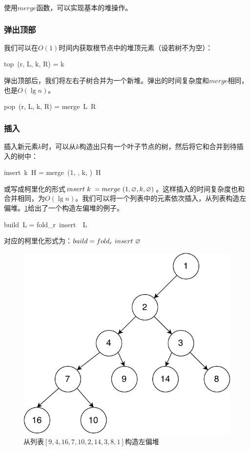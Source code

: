 \documentclass[b5paper]{ctexart}
\begin{document}
使用$merge$函数，可以实现基本的堆操作。

\subsubsection{弹出顶部}
  

我们可以在$O(1)$时间内获取根节点中的堆顶元素（设若树不为空）：

\be
top\ (r, L, k, R) = k
\ee

弹出顶部后，我们将左右子树合并为一个新堆。弹出的时间复杂度和$merge$相同，也是$O(\lg n)$。

\be
pop\ (r, L, k, R) = merge\ L\ R
\ee

\subsubsection{插入}

插入新元素$k$时，可以从$k$构造出只有一个叶子节点的树，然后将它和合并到待插入的树中：

\be
insert\ k\ H = merge\ (1, \nil, k, \nil)\ H
\ee

或写成柯里化的形式$insert\ k\ = merge\ (1, \varnothing, k, \varnothing)$。这样插入的时间复杂度也和合并相同，为$O(\lg n)$。我们可以将一个列表中的元素依次插入，从列表构造左偏堆。\cref{fig:leftist-tree}给出了一个构造左偏堆的例子。

\be
build\ L = fold_r\ insert\ \nil\ L
\ee

对应的柯里化形式为：$build = fold_r\ insert\ \nil$

\begin{figure}[htbp]
  \centering
  \includegraphics[scale=0.5]{img/leftist-tree}
  \caption{从列表$[9, 4, 16, 7, 10, 2, 14, 3, 8, 1]$构造左偏堆}
  \label{fig:leftist-tree}
\end{figure}
\end{document}
